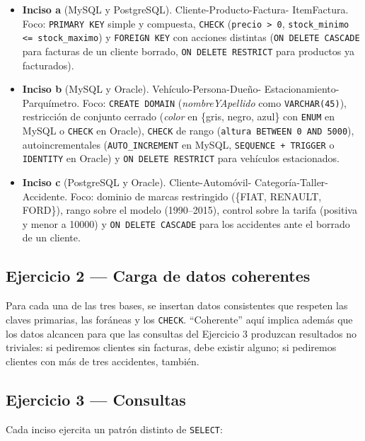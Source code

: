 \documentclass[11pt,a4paper]{article}
\begin{document}
\begin{itemize}
    \item \textbf{Inciso a} (MySQL y PostgreSQL). Cliente-Producto-Factura-
    \mbox{ItemFactura}. Foco: \texttt{PRIMARY KEY} simple y compuesta,
    \texttt{CHECK} (\texttt{precio > 0}, \texttt{stock\_minimo <=
    stock\_maximo}) y \texttt{FOREIGN KEY} con acciones distintas
    (\texttt{ON DELETE CASCADE} para facturas de un cliente borrado,
    \texttt{ON DELETE RESTRICT} para productos ya facturados).
    \item \textbf{Inciso b} (MySQL y Oracle). Vehículo-Persona-Dueño-
    Estacionamiento-Parquímetro. Foco: \texttt{CREATE DOMAIN}
    (\emph{nombreYApellido} como \texttt{VARCHAR(45)}), restricción de
    conjunto cerrado (\emph{color} en \{gris, negro, azul\} con
    \texttt{ENUM} en MySQL o \texttt{CHECK} en Oracle), \texttt{CHECK} de
    rango (\texttt{altura BETWEEN 0 AND 5000}), autoincrementales
    (\texttt{AUTO\_INCREMENT} en MySQL, \texttt{SEQUENCE + TRIGGER} o
    \texttt{IDENTITY} en Oracle) y \texttt{ON DELETE RESTRICT} para vehículos
    estacionados.
    \item \textbf{Inciso c} (PostgreSQL y Oracle). Cliente-Automóvil-
    Categoría-Taller-Accidente. Foco: dominio de marcas restringido
    (\{FIAT, RENAULT, FORD\}), rango sobre el modelo (1990–2015), control
    sobre la tarifa (positiva y menor a 10000) y \texttt{ON DELETE CASCADE}
    para los accidentes ante el borrado de un cliente.
\end{itemize}

\subsection*{Ejercicio 2 --- Carga de datos coherentes}

Para cada una de las tres bases, se insertan datos consistentes que respeten
las claves primarias, las foráneas y los \texttt{CHECK}. ``Coherente'' aquí
implica además que los datos alcancen para que las consultas del
Ejercicio 3 produzcan resultados no triviales: si pediremos clientes sin
facturas, debe existir alguno; si pediremos clientes con más de tres
accidentes, también.

\subsection*{Ejercicio 3 --- Consultas}

Cada inciso ejercita un patrón distinto de \texttt{SELECT}:
\end{document}
